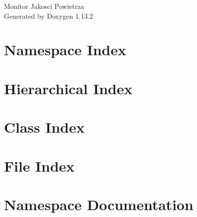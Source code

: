 \documentclass[twoside]{book}
\newcommand{\+}{\discretionary{\mbox{\scriptsize$\hookleftarrow$}}{}{}}
\newcommand{\clearemptydoublepage}{%
    \newpage{\pagestyle{empty}\cleardoublepage}%
  }
\begin{document}
  \raggedbottom
    \hypersetup{pageanchor=false,
                bookmarksnumbered=true,
                pdfencoding=unicode
               }
  \begin{titlepage}
  \vspace*{7cm}
  \begin{center}%
  {\Large Monitor Jakosci Powietrza}\\
  \vspace*{1cm}
  {\large Generated by Doxygen 1.13.2}\\
  \end{center}
  \end{titlepage}
  \clearemptydoublepage
  \tableofcontents
  \clearemptydoublepage
  \hypersetup{pageanchor=true}
\chapter{Namespace Index}

\chapter{Hierarchical Index}

\chapter{Class Index}

\chapter{File Index}

\chapter{Namespace Documentation}


\end{document}
